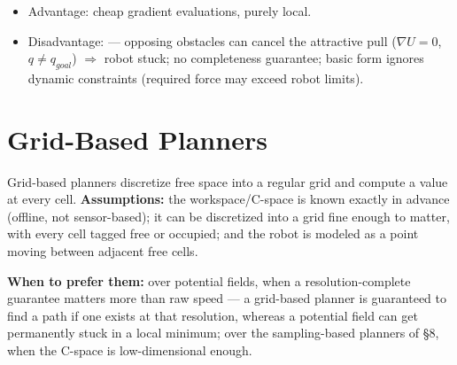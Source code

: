 \begin{itemize}
\item Advantage: cheap gradient evaluations, purely local.
\item Disadvantage:  — opposing obstacles can cancel the attractive pull ($\nabla U=0$, $q\ne q_{goal}$) $\Rightarrow$ robot stuck; no completeness guarantee; basic form ignores dynamic constraints (required force may exceed robot limits).
\end{itemize}


\begin{democallout}
\end{democallout}

\section{Grid-Based Planners}

Grid-based planners discretize free space into a regular grid and compute a value at every cell. \textbf{Assumptions:} the workspace/C-space is known exactly in advance (offline, not sensor-based); it can be discretized into a grid fine enough to matter, with every cell tagged free or occupied; and the robot is modeled as a point moving between adjacent free cells. 

\textbf{When to prefer them:} over potential fields, when a resolution-complete guarantee matters more than raw speed --- a grid-based planner is guaranteed to find a path if one exists at that resolution, whereas a potential field can get permanently stuck in a local minimum; over the sampling-based planners of \S8, when the C-space is low-dimensional enough.

